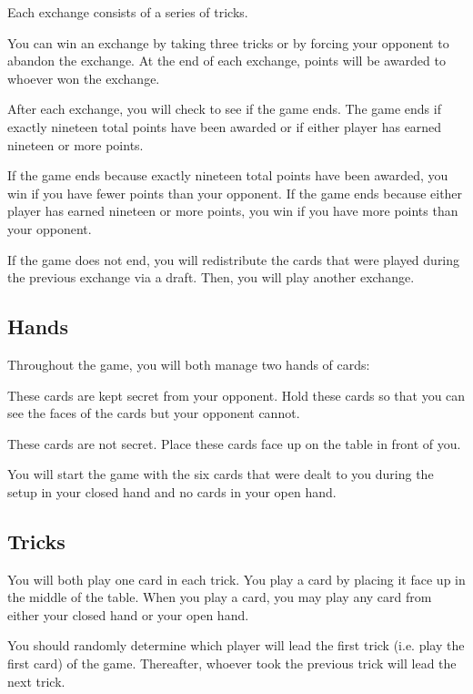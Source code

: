 \documentclass[a6paper, parskip=half, DIV=14, 10pt]{scrartcl}
\begin{document}
Each exchange consists of a series of tricks.

You can win an exchange by taking three tricks or by forcing your opponent to abandon the exchange. At the end of each exchange, points will be awarded to whoever won the exchange.

After each exchange, you will check to see if the game ends. The game ends if exactly nineteen total points have been awarded or if either player has earned nineteen or more points.

If the game ends because exactly nineteen total points have been awarded, you win if you have fewer points than your opponent. If the game ends because either player has earned nineteen or more points, you win if you have more points than your opponent.

If the game does not end, you will redistribute the cards that were played during the previous exchange via a draft. Then, you will play another exchange.

\newpage

\subsection*{Hands}
Throughout the game, you will both manage two hands of cards:
\begin{description}[leftmargin=0pt, labelsep=\widthof{\ }]
	\item[Closed Hand \textendash] These cards are kept secret from your opponent. Hold these cards so that you can see the faces of the cards but your opponent cannot.
	\item[Open Hand \textendash] These cards are not secret. Place these cards face up on the table in front of you.
\end{description}
You will start the game with the six cards that were dealt to you during the setup in your closed hand and no cards in your open hand.

\newpage

\subsection*{Tricks}
You will both play one card in each trick. You play a card by placing it face up in the middle of the table. When you play a card, you may play any card from either your closed hand or your open hand.

You should randomly determine which player will lead the first trick (i.e. play the first card) of the game. Thereafter, whoever took the previous trick will lead the next trick.
\end{document}
